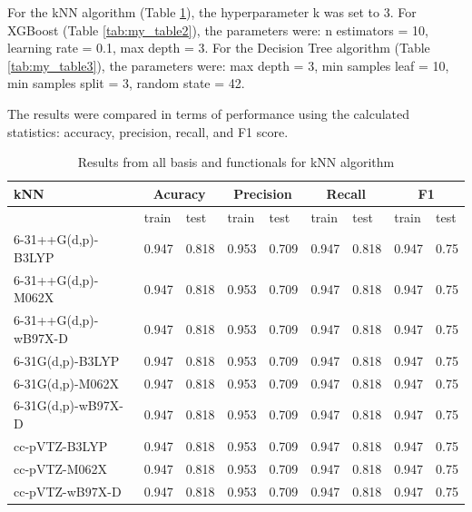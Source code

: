 For the kNN algorithm (Table \ref{tab:my_table1}), the hyperparameter k was set to 3.
For XGBoost (Table \ref{tab:my_table2}), the parameters were: n estimators = 10, learning rate = 0.1, max depth = 3.
For the Decision Tree algorithm (Table \ref{tab:my_table3}), the parameters were: max depth = 3, min samples leaf = 10, min samples split = 3, random state = 42.

The results were compared in terms of performance using the calculated statistics: accuracy, precision, recall, and F1 score.


\begin{table}[H]
\centering
\caption{Results from all basis and functionals for kNN algorithm}
\begin{tabular}{|l |l |l |l |l |l |l |l |l|}\hline      
kNN& \multicolumn{2}{|c|}{Acuracy} & \multicolumn{2}{|c|}{Precision} & \multicolumn{2}{|c|}{Recall} & \multicolumn{2}{|c|}{F1} \\\hline
 & train & test & train & test & train & test & train & test \\\hline
6-31++G(d,p)-B3LYP & 0.947 & 0.818 & 0.953 & 0.709 & 0.947 & 0.818 & 0.947 & 0.75 \\\hline
6-31++G(d,p)-M062X & 0.947 & 0.818 & 0.953 & 0.709 & 0.947 & 0.818 & 0.947 & 0.75 \\\hline
6-31++G(d,p)-wB97X-D & 0.947 & 0.818 & 0.953 & 0.709 & 0.947 & 0.818 & 0.947 & 0.75 \\\hline
6-31G(d,p)-B3LYP & 0.947 & 0.818 & 0.953 & 0.709 & 0.947 & 0.818 & 0.947 & 0.75 \\\hline
6-31G(d,p)-M062X & 0.947 & 0.818 & 0.953 & 0.709 & 0.947 & 0.818 & 0.947 & 0.75 \\\hline
6-31G(d,p)-wB97X-D & 0.947 & 0.818 & 0.953 & 0.709 & 0.947 & 0.818 & 0.947 & 0.75 \\\hline
cc-pVTZ-B3LYP & 0.947 & 0.818 & 0.953 & 0.709 & 0.947 & 0.818 & 0.947 & 0.75 \\\hline
cc-pVTZ-M062X & 0.947 & 0.818 & 0.953 & 0.709 & 0.947 & 0.818 & 0.947 & 0.75 \\\hline
cc-pVTZ-wB97X-D & 0.947 & 0.818 & 0.953 & 0.709 & 0.947 & 0.818 & 0.947 & 0.75 \\ \hline

\end{tabular}
\label{tab:my_table1}
\end{table}


